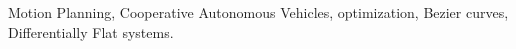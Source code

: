 \noindent Motion Planning, Cooperative Autonomous Vehicles, optimization, Bezier curves, Differentially Flat systems.

